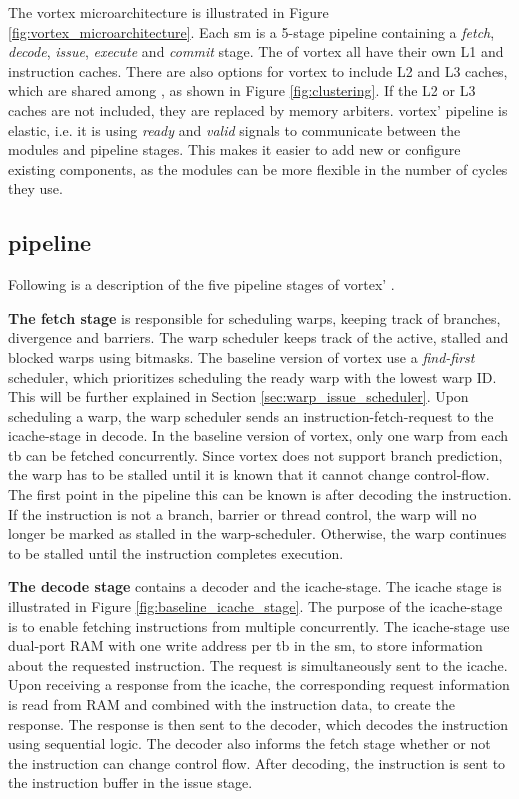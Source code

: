 The \Gls{vortex} microarchitecture is illustrated in Figure \ref{fig:vortex_microarchitecture}. Each \acrshort{sm} is a 5-stage pipeline containing a \textit{fetch}, \textit{decode}, \textit{issue}, \textit{execute} and \textit{commit} stage. The  of \Gls{vortex} all have their own L1 and instruction caches. There are also options for \Gls{vortex} to include L2 and L3 caches, which are shared among , as shown in Figure \ref{fig:clustering}. If the L2 or L3 caches are not included, they are replaced by memory arbiters. \Gls{vortex}' pipeline is elastic\cite{elastic_pipeline}, i.e. it is using \textit{ready} and \textit{valid} signals to communicate between the modules and pipeline stages. This makes it easier to add new or configure existing components, as the modules can be more flexible in the number of cycles they use.

\subsection{pipeline} \label{sec:vortex_pipeline}
Following is a description of the five pipeline stages of \Gls{vortex}' .

\vspace{1mm}\noindent
\textbf{The fetch stage} is responsible for scheduling warps, keeping track of branches, divergence and barriers. The warp scheduler keeps track of the active, stalled and blocked warps using bitmasks. The baseline version of \Gls{vortex} use a \textit{find-first} scheduler, which prioritizes scheduling the ready warp with the lowest warp ID. This will be further explained in Section \ref{sec:warp_issue_scheduler}. Upon scheduling a warp, the warp scheduler sends an instruction-fetch-request to the icache-stage in decode. In the baseline version of \Gls{vortex}, only one warp from each \acrshort{tb} can be fetched concurrently. Since vortex does not support branch prediction, the warp has to be stalled until it is known that it cannot change control-flow. The first point in the pipeline this can be known is after decoding the instruction. If the instruction is not a branch, barrier or thread control, the warp will no longer be marked as stalled in the warp-scheduler. Otherwise, the warp continues to be stalled until the instruction completes execution.

\noindent
\textbf{The decode stage} contains a decoder and the icache-stage. The icache stage is illustrated in Figure \ref{fig:baseline_icache_stage}. The purpose of the icache-stage is to enable fetching instructions from multiple  concurrently. The icache-stage use dual-port RAM with one write address per \acrshort{tb} in the \acrshort{sm}, to store information about the requested instruction. The request is simultaneously sent to the icache. Upon receiving a response from the icache, the corresponding request information is read from RAM and combined with the instruction data, to create the response. The response is then sent to the decoder, which decodes the instruction using sequential logic. The decoder also informs the fetch stage whether or not the instruction can change control flow. After decoding, the instruction is sent to the instruction buffer in the issue stage.

